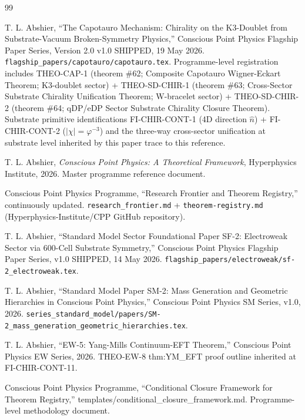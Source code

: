 \documentclass[11pt,letterpaper]{article}
\begin{document}
\begin{thebibliography}{99}

T. L. Abshier, ``The Capotauro Mechanism: Chirality on the K3-Doublet from Substrate-Vacuum Broken-Symmetry Physics,'' Conscious Point Physics Flagship Paper Series, Version 2.0 v1.0 SHIPPED, 19 May 2026. \texttt{flagship\_papers/capotauro/capotauro.tex}. Programme-level registration includes THEO-CAP-1 (theorem \#62; Composite Capotauro Wigner-Eckart Theorem; K3-doublet sector) + THEO-SD-CHIR-1 (theorem \#63; Cross-Sector Substrate Chirality Unification Theorem; W-bracelet sector) + THEO-SD-CHIR-2 (theorem \#64; qDP/eDP Sector Substrate Chirality Closure Theorem). Substrate primitive identifications FI-CHIR-CONT-1 (4D direction $\hat{n}$) + FI-CHIR-CONT-2 ($|\chi| = \varphi^{-3}$) and the three-way cross-sector unification at substrate level inherited by this paper trace to this reference.

T. L. Abshier, \emph{Conscious Point Physics: A Theoretical Framework}, Hyperphysics Institute, 2026. Master programme reference document.

Conscious Point Physics Programme, ``Research Frontier and Theorem Registry,'' continuously updated. \texttt{research\_frontier.md} + \texttt{theorem-registry.md} (Hyperphysics-Institute/CPP GitHub repository).

T. L. Abshier, ``Standard Model Sector Foundational Paper SF-2: Electroweak Sector via 600-Cell Substrate Symmetry,'' Conscious Point Physics Flagship Paper Series, v1.0 SHIPPED, 14 May 2026. \texttt{flagship\_papers/electroweak/sf-2\_electroweak.tex}.

T. L. Abshier, ``Standard Model Paper SM-2: Mass Generation and Geometric Hierarchies in Conscious Point Physics,'' Conscious Point Physics SM Series, v1.0, 2026. \texttt{series\_standard\_model/papers/SM-2\_mass\_generation\_geometric\_hierarchies.tex}.

T. L. Abshier, ``EW-5: Yang-Mills Continuum-EFT Theorem,'' Conscious Point Physics EW Series, 2026. THEO-EW-8 thm:YM\_EFT proof outline inherited at FI-CHIR-CONT-11.

Conscious Point Physics Programme, ``Conditional Closure Framework for Theorem Registry,'' templates/conditional\_closure\_framework.md. Programme-level methodology document.


\end{thebibliography}
\end{document}
